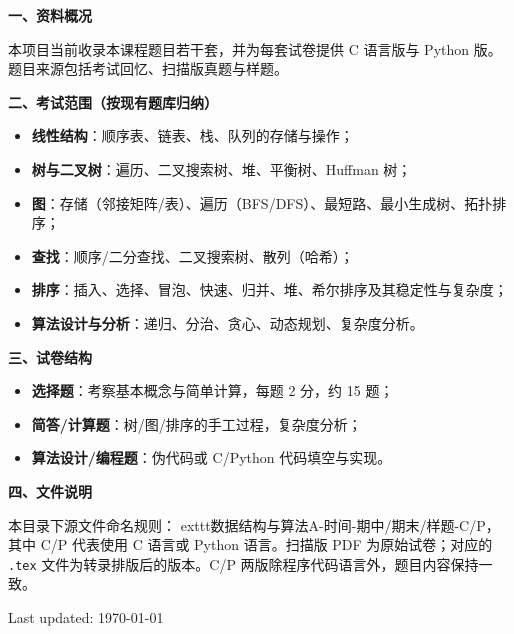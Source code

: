 
\textbf{一、资料概况}

本项目当前收录本课程题目若干套，并为每套试卷提供 C 语言版与 Python 版。题目来源包括考试回忆、扫描版真题与样题。

\textbf{二、考试范围（按现有题库归纳）}
\begin{itemize}[leftmargin=2em,itemsep=0.2em,topsep=0.2em]
  \item \textbf{线性结构}：顺序表、链表、栈、队列的存储与操作；
  \item \textbf{树与二叉树}：遍历、二叉搜索树、堆、平衡树、Huffman 树；
  \item \textbf{图}：存储（邻接矩阵/表）、遍历（BFS/DFS）、最短路、最小生成树、拓扑排序；
  \item \textbf{查找}：顺序/二分查找、二叉搜索树、散列（哈希）；
  \item \textbf{排序}：插入、选择、冒泡、快速、归并、堆、希尔排序及其稳定性与复杂度；
  \item \textbf{算法设计与分析}：递归、分治、贪心、动态规划、复杂度分析。
\end{itemize}

\textbf{三、试卷结构}
\begin{itemize}[leftmargin=2em,itemsep=0.2em,topsep=0.2em]
  \item \textbf{选择题}：考察基本概念与简单计算，每题 2 分，约 15 题；
  \item \textbf{简答/计算题}：树/图/排序的手工过程，复杂度分析；
  \item \textbf{算法设计/编程题}：伪代码或 C/Python 代码填空与实现。
\end{itemize}

\textbf{四、文件说明}

本目录下源文件命名规则：	exttt{数据结构与算法A-时间-期中/期末/样题-C/P}，其中 C/P 代表使用 C 语言或 Python 语言。扫描版 PDF 为原始试卷；对应的 \texttt{.tex} 文件为转录排版后的版本。C/P 两版除程序代码语言外，题目内容保持一致。

\vfill
\hfill Last updated: \today
